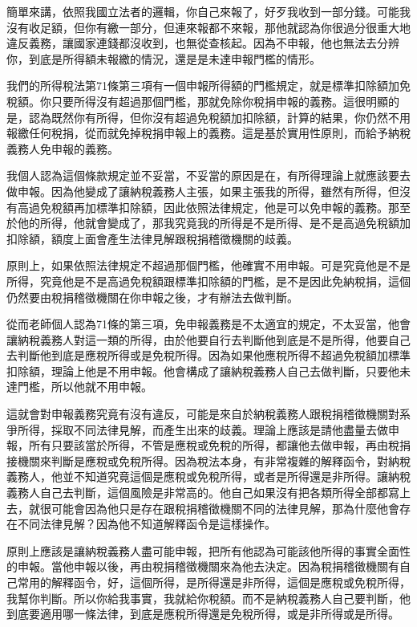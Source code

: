 \documentclass[oneside,sub3section]{ctexbook}
\begin{document}
簡單來講，依照我國立法者的邏輯，你自己來報了，好歹我收到一部分錢。可能我沒有收足額，但你有繳一部分，但連來報都不來報，那他就認為你很過分很重大地違反義務，讓國家連錢都沒收到，也無從查核起。因為不申報，他也無法去分辨你，到底是所得額未報繳的情況，還是是未達申報門檻的情形。

我們的所得稅法第71條第三項有一個申報所得額的門檻規定，就是標準扣除額加免稅額。你只要所得沒有超過那個門檻，那就免除你稅捐申報的義務。這很明顯的是，認為既然你有所得，但你沒有超過免稅額加扣除額，計算的結果，你仍然不用報繳任何稅捐，從而就免掉稅捐申報上的義務。這是基於實用性原則，而給予納稅義務人免申報的義務。

我個人認為這個條款規定並不妥當，不妥當的原因是在，有所得理論上就應該要去做申報。因為他變成了讓納稅義務人主張，如果主張我的所得，雖然有所得，但沒有高過免稅額再加標準扣除額，因此依照法律規定，他是可以免申報的義務。那至於他的所得，他就會變成了，那我究竟我的所得是不是所得、是不是高過免稅額加扣除額，額度上面會產生法律見解跟稅捐稽徵機關的歧義。

原則上，如果依照法律規定不超過那個門檻，他確實不用申報。可是究竟他是不是所得，究竟他是不是高過免稅額跟標準扣除額的門檻，是不是因此免納稅捐，這個仍然要由稅捐稽徵機關在你申報之後，才有辦法去做判斷。

從而老師個人認為71條的第三項，免申報義務是不太適宜的規定，不太妥當，他會讓納稅義務人對這一類的所得，由於他要自行去判斷他到底是不是所得，他要自己去判斷他到底是應稅所得或是免稅所得。因為如果他應稅所得不超過免稅額加標準扣除額，理論上他是不用申報。他會構成了讓納稅義務人自己去做判斷，只要他未達門檻，所以他就不用申報。

這就會對申報義務究竟有沒有違反，可能是來自於納稅義務人跟稅捐稽徵機關對系爭所得，採取不同法律見解，而產生出來的歧義。理論上應該是請他盡量去做申報，所有只要該當於所得，不管是應稅或免稅的所得，都讓他去做申報，再由稅捐接機關來判斷是應稅或免稅所得。因為稅法本身，有非常複雜的解釋函令，對納稅義務人，他並不知道究竟這個是應稅或免稅所得，或者是所得還是非所得。讓納稅義務人自己去判斷，這個風險是非常高的。他自己如果沒有把各類所得全部都寫上去，就很可能會因為他只是存在跟稅捐稽徵機關不同的法律見解，那為什麼他會存在不同法律見解？因為他不知道解釋函令是這樣操作。

原則上應該是讓納稅義務人盡可能申報，把所有他認為可能該他所得的事實全面性的申報。當他申報以後，再由稅捐稽徵機關來為他去決定。因為稅捐稽徵機關有自己常用的解釋函令，好，這個所得，是所得還是非所得，這個是應稅或免稅所得，我幫你判斷。所以你給我事實，我就給你稅額。而不是納稅義務人自己要判斷，他到底要適用哪一條法律，到底是應稅所得還是免稅所得，或是非所得或是所得。
\end{document}
